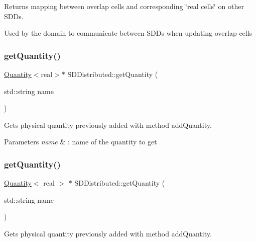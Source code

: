 Returns mapping between overlap cells and corresponding \char`\"{}real cells\char`\"{} on other S\+D\+Ds. 

Used by the domain to communicate between S\+D\+Ds when updating overlap cells \mbox{\label{classSDDistributed_ade2c34b9bd189f3fb7409fc8dddd55ee}} 
\subsubsection{\texorpdfstring{get\+Quantity()}{getQuantity()}\hspace{0.1cm}{\footnotesize\ttfamily [1/2]}}
{\footnotesize\ttfamily \hyperlink{classQuantity}{Quantity}$<$real$>$$\ast$ S\+D\+Distributed\+::get\+Quantity (\begin{DoxyParamCaption}\item[{std\+::string}]{name }\end{DoxyParamCaption})}



Gets physical quantity previously added with method add\+Quantity. 


\begin{DoxyParams}{Parameters}
{\em name} & \+: name of the quantity to get \\
\hline
\end{DoxyParams}
\mbox{\label{classSDDistributed_a14f296606ff1afa1e4878fa6c4928afc}} 
\subsubsection{\texorpdfstring{get\+Quantity()}{getQuantity()}\hspace{0.1cm}{\footnotesize\ttfamily [2/2]}}
{\footnotesize\ttfamily \hyperlink{classQuantity}{Quantity}$<$ real $>$ $\ast$ S\+D\+Distributed\+::get\+Quantity (\begin{DoxyParamCaption}\item[{std\+::string}]{name }\end{DoxyParamCaption})}



Gets physical quantity previously added with method add\+Quantity. 


